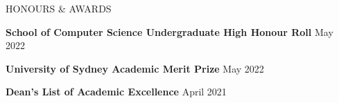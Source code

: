 
\begin{ResumeSection}{HONOURS \& AWARDS} 



    \textbf{School of Computer Science Undergraduate High Honour Roll}
    \hfill May 2022
    
    \vspace{-0.5em}
    
    \textbf{University of Sydney Academic Merit Prize}
    \hfill May 2022
    
    \vspace{-0.5em}

    \textbf{Dean's List of Academic Excellence}
    \hfill April 2021
    
    
    

    
    
\end{ResumeSection}